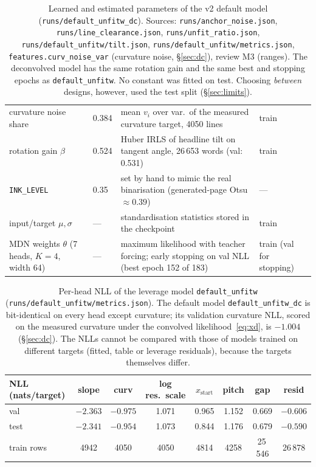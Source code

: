 \documentclass[11pt,a4paper]{article}
\newcommand{\src}[1]{{\footnotesize\texttt{#1}}}
\begin{document}
\begin{table}[H]
\begin{tabular}{p{3.6cm}p{2.7cm}p{6.1cm}p{1.8cm}}
curvature noise share & 0.384 & mean $v_i$ over var.\ of the measured curvature target, 4050 lines & train\\
rotation gain $\beta$ & 0.524 & Huber IRLS of headline tilt on tangent angle, 26\,653 words (val: 0.531) & train\\
\texttt{INK\_LEVEL} & 0.35 & set by hand to mimic the real binarisation (generated-page Otsu $\approx0.39$) & ---\\
input/target $\mu,\sigma$ & --- & standardisation statistics stored in the checkpoint & train\\
MDN weights $\theta$ (7 heads, $K=4$, width 64) & --- & maximum likelihood with teacher forcing; early stopping on val NLL (best epoch 152 of 183) & train (val for stopping)\\
\bottomrule
\end{tabular}
\caption{Learned and estimated parameters of the v2 default model
(\texttt{runs/default\_unfitw\_dc}). Sources: \src{runs/anchor\_noise.json},
\src{runs/line\_clearance.json}, \src{runs/unfit\_ratio.json},
\src{runs/default\_unfitw/tilt.json}, \src{runs/default\_unfitw/metrics.json},
\texttt{features.curv\_noise\_var} (curvature noise, \S\ref{sec:dc}),
review M3 (ranges). The deconvolved model has the same rotation gain and the
same best and stopping epochs as \texttt{default\_unfitw}. No constant was
fitted on test. Choosing \emph{between} designs, however, used the test split
(\S\ref{sec:limits}).}
\label{tab:params}
\end{table}

\begin{table}[H]\centering\small
\begin{tabular}{lccccccc}
\toprule
NLL (nats/target) & slope & curv & log res.\ scale & $x_\text{start}$ & pitch & gap & resid\\
\midrule
val  & $-2.363$ & $-0.975$ & 1.071 & 0.965 & 1.152 & 0.669 & $-0.606$\\
test & $-2.341$ & $-0.954$ & 1.073 & 0.844 & 1.176 & 0.679 & $-0.590$\\
\midrule
train rows & 4942 & 4050 & 4050 & 4814 & 4258 & 25\,546 & 26\,878\\
\bottomrule
\end{tabular}
\caption{Per-head NLL of the leverage model \texttt{default\_unfitw}
(\src{runs/default\_unfitw/metrics.json}). The default model
\texttt{default\_unfitw\_dc} is bit-identical on every head except curvature;
its validation curvature NLL, scored on the measured curvature under the
convolved likelihood~\eqref{eq:xd}, is $-1.004$ (\S\ref{sec:dc}). The NLLs
cannot be compared with those of models trained on different targets (fitted,
table or leverage residuals), because the targets themselves differ.}
\end{table}
\end{document}
